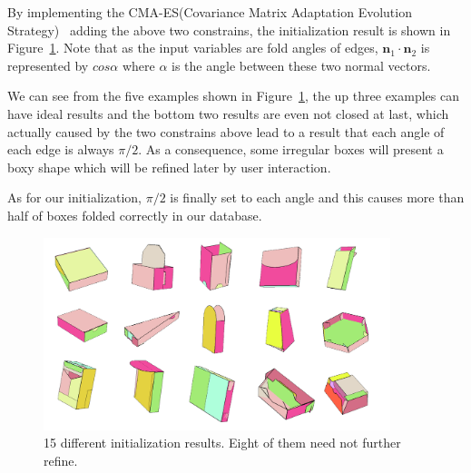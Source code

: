 By implementing the CMA-ES(Covariance Matrix Adaptation Evolution Strategy)~\cite{CMAES} adding the above two constrains, the initialization result is shown in Figure~\ref{fig:initial}. Note that as the input variables are fold angles of edges, $\mathbf{n}_1 \cdot \mathbf{n}_2$ is represented by $cos\alpha$ where $\alpha$ is the angle between these two normal vectors. 

We can see from the five examples shown in Figure~\ref{fig:initial}, the up three examples can have ideal results and the bottom two results are even not closed at last, which actually caused by the two constrains above lead to a result that each angle of each edge is always $\pi/2$. As a consequence, some irregular boxes will present a boxy shape which will be refined later by user interaction.

As for our initialization, $\pi/2$ is finally set to each angle and this causes more than half of boxes folded correctly in our database.


\begin{figure}
	\centering
	\includegraphics[width=0.9\textwidth]{images/initial2.jpg}
	\caption{15 different initialization results. Eight of them need not further refine.}
	\label{fig:initial}
\end{figure}



